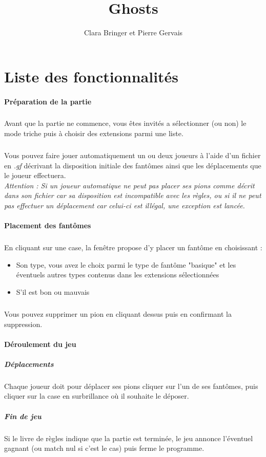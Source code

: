 \documentclass[]{report}
\title{Ghosts}
\author{Clara Bringer et Pierre Gervais}
\begin{document}
\maketitle

\section{Liste des fonctionnalités}

\paragraph{Préparation de la partie}
\subparagraph*{}
Avant que la partie ne commence, vous êtes invités a sélectionner (ou non) le mode triche puis à choisir des extensions parmi une liste.
\subparagraph*{}
Vous pouvez faire jouer automatiquement un ou deux joueurs à l'aide d'un fichier en \textit{.gf} décrivant la disposition initiale des fantômes ainsi que les déplacements que le joueur effectuera.\\
\emph{Attention : Si un joueur automatique ne peut pas placer ses pions comme décrit dans son fichier car sa disposition est incompatible avec les règles, ou si il ne peut pas effectuer un déplacement car celui-ci est illégal, une exception est lancée.}

\paragraph{Placement des fantômes}
\subparagraph*{}
En cliquant sur une case, la fenêtre propose d'y placer un fantôme en choisissant :
\begin{itemize}
	\item Son type, vous avez le choix parmi le type de fantôme "basique" et les éventuels autres types contenus dans les extensions sélectionnées
	\item S'il est bon ou mauvais
\end{itemize}
\subparagraph*{}
Vous pouvez supprimer un pion en cliquant dessus puis en confirmant la suppression.

\paragraph{Déroulement du jeu}
\subparagraph{Déplacements}
Chaque joueur doit pour déplacer ses pions cliquer sur l'un de ses fantômes, puis cliquer sur la case en surbrillance où il souhaite le déposer.
\subparagraph{Fin de jeu}
Si le livre de règles indique que la partie est terminée, le jeu annonce l'éventuel gagnant (ou match nul si c'est le cas) puis ferme le programme.
\end{document}
